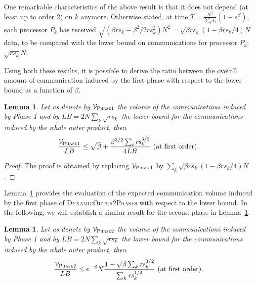 \documentclass[a4paper,10pt]{article}
\newtheorem{lemma}[theorem]{Lemma}
\newcommand{\stupidthreshold}{\textsc{Dynamic\-Outer\-2Phases}\xspace}
\begin{document}
One remarkable characteristics of the above result is that it does not
depend (at least up to order 2) on $k$ anymore. Otherwise stated, at
time $T =\frac{N^2}{\sum_i s_i} (1 - e^{\beta}),$ each processor $P_k$
has received $\sqrt{(\beta \mathit{rs}_k -\beta^2/2 \mathit{rs}_k^2)
  N^2} = \sqrt{\beta \mathit{rs}_k} (1 -\beta \mathit{rs}_k/4) N$
data, to be compared with the lower bound on communications for
processor $P_k$: $\sqrt{\mathit{rs}_k} N$.


Using both these results, it is possible to derive the ratio between the overall amount of communication induced by the first phase with respect to the lower bound as a function of $\beta$.

\begin{lemma}
\label{lemP1}
Let us denote by ${\cal V}_{\textsc{Phase1}}$ the volume of the
communications induced by Phase 1 and by $LB = 2 N \sum_k \sqrt{\mathit{rs}_k}$ the lower bound for the communications induced by the whole outer product, then 
$$ \frac{{\cal V}_{\textsc{Phase1}}}{LB} \leq  \sqrt{\beta}  + \frac{\beta^{3/2} \sum_i \mathit{rs}_k^{3/2}}{ 4 LB}   \textnormal{ (at first order)}.
$$
\end{lemma}

\begin{proof} The proof is obtained by replacing ${\cal V}_{\textsc{Phase1}}$ by $\sum_k \sqrt{\beta \mathit{rs}_k} (1 -\beta \mathit{rs}_k/4)  N$.
\end{proof}


Lemma~\ref{lemP1} provides the evaluation of the expected
communication volume induced by the first phase of \stupidthreshold
with respect to the lower bound. In the following, we will establish
a similar result for the second phase in Lemma~\ref{lemP2}.


\begin{lemma}
\label{lemP2}
Let us denote by ${\cal V}_{\textsc{Phase2}}$ the volume of the communications induced by Phase 1 and by $LB = 2 N \sum_k \sqrt{\mathit{rs}_k}$ the lower bound for the communications induced by the whole outer product, then 
$$ \frac{{\cal V}_{\textsc{Phase2}}}{LB} \leq  e^{-\beta} N \frac{1-\sqrt{\beta}  \sum_k \mathit{rs}_k^{3/2}}{\sum_k \mathit{rs}_k^{1/2}}   \textnormal{ (at first order).}
$$
\end{lemma}
\end{document}
